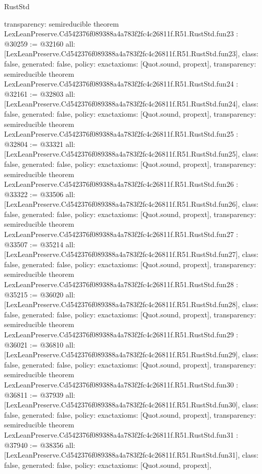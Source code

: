 \begin{lexlean}{RustStd}
\begin{coremodule}
{  transparency: semireducible
}
theorem LexLeanPreserve.Cd542376f089388a4a783f2fc4c26811f.R51.RustStd.fun23 : @30259 := @32160 {
  all: [LexLeanPreserve.Cd542376f089388a4a783f2fc4c26811f.R51.RustStd.fun23],
  class: false,
  generated: false,
  policy: exact{axioms: [Quot.sound, propext]},
  transparency: semireducible
}
theorem LexLeanPreserve.Cd542376f089388a4a783f2fc4c26811f.R51.RustStd.fun24 : @32161 := @32803 {
  all: [LexLeanPreserve.Cd542376f089388a4a783f2fc4c26811f.R51.RustStd.fun24],
  class: false,
  generated: false,
  policy: exact{axioms: [Quot.sound, propext]},
  transparency: semireducible
}
theorem LexLeanPreserve.Cd542376f089388a4a783f2fc4c26811f.R51.RustStd.fun25 : @32804 := @33321 {
  all: [LexLeanPreserve.Cd542376f089388a4a783f2fc4c26811f.R51.RustStd.fun25],
  class: false,
  generated: false,
  policy: exact{axioms: [Quot.sound, propext]},
  transparency: semireducible
}
theorem LexLeanPreserve.Cd542376f089388a4a783f2fc4c26811f.R51.RustStd.fun26 : @33322 := @33506 {
  all: [LexLeanPreserve.Cd542376f089388a4a783f2fc4c26811f.R51.RustStd.fun26],
  class: false,
  generated: false,
  policy: exact{axioms: [Quot.sound, propext]},
  transparency: semireducible
}
theorem LexLeanPreserve.Cd542376f089388a4a783f2fc4c26811f.R51.RustStd.fun27 : @33507 := @35214 {
  all: [LexLeanPreserve.Cd542376f089388a4a783f2fc4c26811f.R51.RustStd.fun27],
  class: false,
  generated: false,
  policy: exact{axioms: [Quot.sound, propext]},
  transparency: semireducible
}
theorem LexLeanPreserve.Cd542376f089388a4a783f2fc4c26811f.R51.RustStd.fun28 : @35215 := @36020 {
  all: [LexLeanPreserve.Cd542376f089388a4a783f2fc4c26811f.R51.RustStd.fun28],
  class: false,
  generated: false,
  policy: exact{axioms: [Quot.sound, propext]},
  transparency: semireducible
}
theorem LexLeanPreserve.Cd542376f089388a4a783f2fc4c26811f.R51.RustStd.fun29 : @36021 := @36810 {
  all: [LexLeanPreserve.Cd542376f089388a4a783f2fc4c26811f.R51.RustStd.fun29],
  class: false,
  generated: false,
  policy: exact{axioms: [Quot.sound, propext]},
  transparency: semireducible
}
theorem LexLeanPreserve.Cd542376f089388a4a783f2fc4c26811f.R51.RustStd.fun30 : @36811 := @37939 {
  all: [LexLeanPreserve.Cd542376f089388a4a783f2fc4c26811f.R51.RustStd.fun30],
  class: false,
  generated: false,
  policy: exact{axioms: [Quot.sound, propext]},
  transparency: semireducible
}
theorem LexLeanPreserve.Cd542376f089388a4a783f2fc4c26811f.R51.RustStd.fun31 : @37940 := @38356 {
  all: [LexLeanPreserve.Cd542376f089388a4a783f2fc4c26811f.R51.RustStd.fun31],
  class: false,
  generated: false,
  policy: exact{axioms: [Quot.sound, propext]},
}
\end{coremodule}
\end{lexlean}
